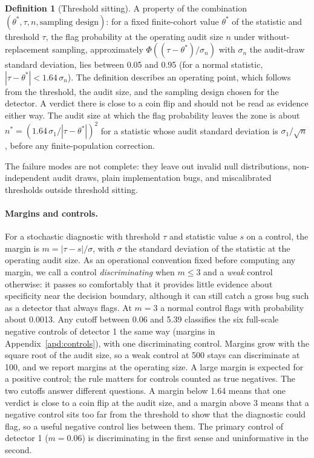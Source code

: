 \documentclass[10pt]{article}
\theoremstyle{definition}
\newtheorem{definition}{Definition}
\begin{document}
\begin{definition}[Threshold sitting]
A property of the combination $(\theta^\ast, \tau, n, \text{sampling design})$: for a fixed finite-cohort value $\theta^\ast$ of the statistic and threshold $\tau$, the flag probability at the operating audit size $n$ under without-replacement sampling, approximately $\Phi((\tau-\theta^\ast)/\sigma_n)$ with $\sigma_n$ the audit-draw standard deviation, lies between 0.05 and 0.95 (for a normal statistic, $|\tau-\theta^\ast|<1.64\,\sigma_n$). The definition describes an operating point, which follows from the threshold, the audit size, and the sampling design chosen for the detector. A verdict there is close to a coin flip and should not be read as evidence either way. The audit size at which the flag probability leaves the zone is about $n^\ast=(1.64\,\sigma_1/|\tau-\theta^\ast|)^2$ for a statistic whose audit standard deviation is $\sigma_1/\sqrt{n}$, before any finite-population correction.
\end{definition}

The failure modes are not complete: they leave out invalid null distributions, non-independent audit draws, plain implementation bugs, and miscalibrated thresholds outside threshold sitting.

\paragraph{Margins and controls.} For a stochastic diagnostic with threshold $\tau$ and statistic value $s$ on a control, the margin is $m=|\tau-s|/\sigma$, with $\sigma$ the standard deviation of the statistic at the operating audit size. As an operational convention fixed before computing any margin, we call a control \emph{discriminating} when $m\le 3$ and a \emph{weak} control otherwise: it passes so comfortably that it provides little evidence about specificity near the decision boundary, although it can still catch a gross bug such as a detector that always flags. At $m=3$ a normal control flags with probability about 0.0013. Any cutoff between 0.06 and 5.39 classifies the six full-scale negative controls of detector 1 the same way (margins in Appendix~\ref{apd:controls}), with one discriminating control. Margins grow with the square root of the audit size, so a weak control at 500 stays can discriminate at 100, and we report margins at the operating size. A large margin is expected for a positive control; the rule matters for controls counted as true negatives. The two cutoffs answer different questions. A margin below 1.64 means that one verdict is close to a coin flip at the audit size, and a margin above 3 means that a negative control sits too far from the threshold to show that the diagnostic could flag, so a useful negative control lies between them. The primary control of detector 1 ($m=0.06$) is discriminating in the first sense and uninformative in the second.
\end{document}
